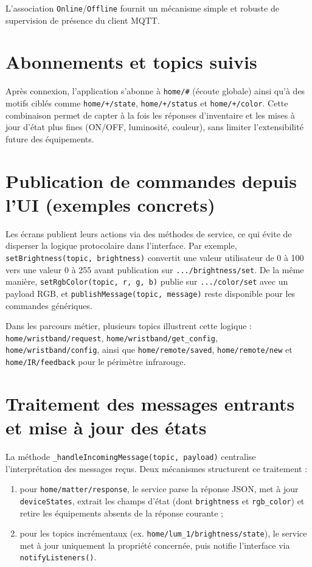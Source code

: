 \documentclass[12pt,a4paper]{report}
\begin{document}
L’association \texttt{Online}/\texttt{Offline} fournit un mécanisme simple et robuste de supervision de présence du client MQTT.

\section{Abonnements et topics suivis}
Après connexion, l’application s’abonne à \texttt{home/\#} (écoute globale) ainsi qu’à des motifs ciblés comme \texttt{home/+/state}, \texttt{home/+/status} et \texttt{home/+/color}. Cette combinaison permet de capter à la fois les réponses d’inventaire et les mises à jour d’état plus fines (ON/OFF, luminosité, couleur), sans limiter l’extensibilité future des équipements.

\section{Publication de commandes depuis l’UI (exemples concrets)}
Les écrans publient leurs actions via des méthodes de service, ce qui évite de disperser la logique protocolaire dans l’interface. Par exemple, \texttt{setBrightness(topic, brightness)} convertit une valeur utilisateur de 0 à 100 vers une valeur 0 à 255 avant publication sur \texttt{.../brightness/set}. De la même manière, \texttt{setRgbColor(topic, r, g, b)} publie sur \texttt{.../color/set} avec un payload RGB, et \texttt{publishMessage(topic, message)} reste disponible pour les commandes génériques.

Dans les parcours métier, plusieurs topics illustrent cette logique : \texttt{home/wristband/request}, \texttt{home/wristband/get\_config}, \texttt{home/wristband/config}, ainsi que \texttt{home/remote/saved}, \texttt{home/remote/new} et \texttt{home/IR/feedback} pour le périmètre infrarouge.

\section{Traitement des messages entrants et mise à jour des états}
La méthode \texttt{\_handleIncomingMessage(topic, payload)} centralise l’interprétation des messages reçus. Deux mécanismes structurent ce traitement :
\begin{enumerate}[leftmargin=*]
  \item pour \texttt{home/matter/response}, le service parse la réponse JSON, met à jour \texttt{deviceStates}, extrait les champs d’état (dont \texttt{brightness} et \texttt{rgb\_color}) et retire les équipements absents de la réponse courante ;
  \item pour les topics incrémentaux (ex. \texttt{home/lum\_1/brightness/state}), le service met à jour uniquement la propriété concernée, puis notifie l’interface via \texttt{notifyListeners()}.
\end{enumerate}
\end{document}
